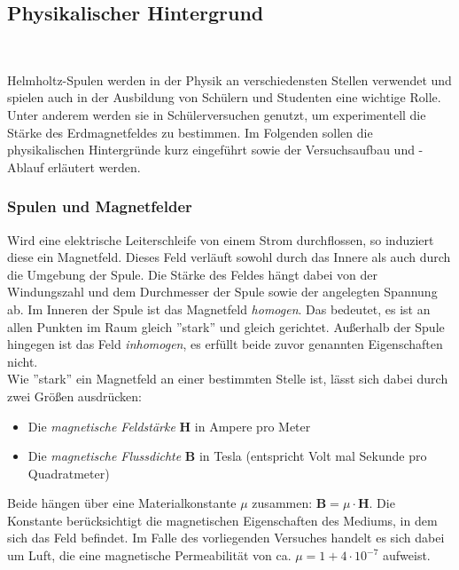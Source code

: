 \subsection{Physikalischer Hintergrund}
\begin{center}
	\\
\end{center}


Helmholtz-Spulen werden in der Physik an verschiedensten Stellen verwendet und spielen auch in der Ausbildung von Schülern und Studenten eine wichtige Rolle. Unter anderem werden sie in Schülerversuchen genutzt, um experimentell die Stärke des Erdmagnetfeldes zu bestimmen. Im Folgenden sollen die physikalischen Hintergründe kurz eingeführt sowie der Versuchsaufbau und -Ablauf erläutert werden.

\subsubsection{Spulen und Magnetfelder}
Wird eine elektrische Leiterschleife von einem Strom durchflossen, so induziert diese ein Magnetfeld. Dieses Feld verläuft sowohl durch das Innere als auch durch die Umgebung der Spule. Die Stärke des Feldes hängt dabei von der Windungszahl und dem Durchmesser der Spule sowie der angelegten Spannung ab.
Im Inneren der Spule ist das Magnetfeld \textit{homogen}. Das bedeutet, es ist an allen Punkten im Raum gleich ''stark'' und gleich gerichtet. Außerhalb der Spule hingegen ist das Feld \textit{inhomogen}, es erfüllt beide zuvor genannten Eigenschaften nicht.\\

Wie ''stark'' ein Magnetfeld an einer bestimmten Stelle ist, lässt sich dabei durch zwei Größen ausdrücken:
\begin{itemize}
	\setlength{\itemsep}{-5pt}
	\item Die\textit{ magnetische Feldstärke} $\boldsymbol{H}$ in Ampere pro Meter
	\item Die \textit{magnetische Flussdichte} $\boldsymbol{B}$ in Tesla (entspricht Volt mal Sekunde pro Quadratmeter)
\end{itemize}  
Beide hängen über eine Materialkonstante $\mu$ zusammen: $\boldsymbol{B} = \mu \cdot \boldsymbol{H}$. Die Konstante berücksichtigt die magnetischen Eigenschaften des Mediums, in dem sich das Feld befindet. Im Falle des vorliegenden Versuches handelt es sich dabei um Luft, die eine magnetische Permeabilität von ca. $\mu = 1 + 4 \cdot 10^{-7}$ aufweist.\\

